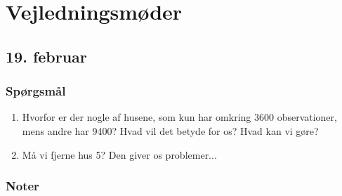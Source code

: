 \chapter{Vejledningsmøder}

\section{19. februar}


\subsection{Spørgsmål}
\begin{enumerate}
    \item Hvorfor er der nogle af husene, som kun har omkring 3600 observationer, mens andre har 9400? Hvad vil det betyde for os? Hvad kan vi gøre?
    \item Må vi fjerne hus 5? Den giver os problemer... 
\end{enumerate}

\subsection{Noter}